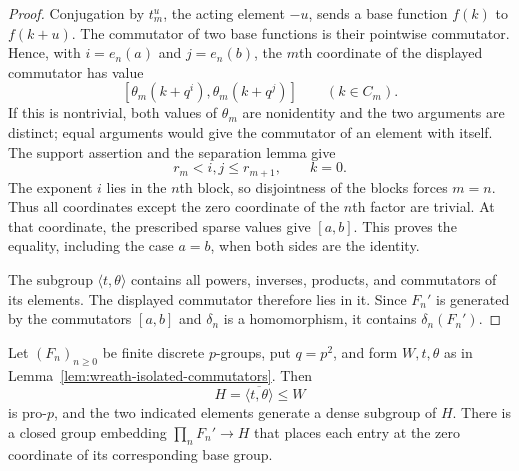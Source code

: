 \begin{proof}
Conjugation by $t_m^u$, the acting element $-u$, sends a base
function $f(k)$ to $f(k+u)$. The commutator of two base functions
is their pointwise commutator. Hence, with $i=e_n(a)$ and $j=e_n(b)$,
the $m$th coordinate of the displayed commutator has value
\[
 [\theta_m(k+q^i),\theta_m(k+q^j)]
 \qquad(k\in C_m).
\]
If this is nontrivial, both values of $\theta_m$ are nonidentity
and the two arguments are distinct; equal arguments would give
the commutator of an element with itself. The support assertion
and the separation lemma give
\[
 r_m<i,j\le r_{m+1},\qquad k=0.
\]
The exponent $i$ lies in the $n$th block, so disjointness of the
blocks forces $m=n$. Thus all coordinates except the zero
coordinate of the $n$th factor are trivial. At that coordinate,
the prescribed sparse values give $[a,b]$. This proves the equality,
including the case $a=b$, when both sides are the identity.

The subgroup $\langle t,\theta\rangle$ contains all powers,
inverses, products, and commutators of its elements. The displayed
commutator therefore lies in it. Since $F_n'$ is generated by the
commutators $[a,b]$ and $\delta_n$ is a homomorphism, it contains
$\delta_n(F_n')$.
\end{proof}

\begin{lemma}
\label{lem:derived-product-two-generator}
\leanok
Let $(F_n)_{n\ge0}$ be finite discrete $p$-groups, put $q=p^2$,
and form $W,t,\theta$ as in Lemma~\ref{lem:wreath-isolated-commutators}.
Then
\[
 H=\overline{\langle t,\theta\rangle}\le W
\]
is pro-$p$, and the two indicated elements generate a dense
subgroup of $H$. There is a closed group embedding
$\prod_nF_n'\longrightarrow H$ that places each entry at the
zero coordinate of its corresponding base group.
\end{lemma}

